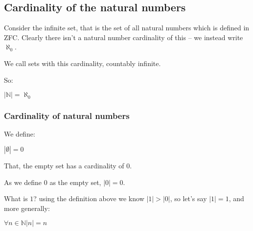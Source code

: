 
\subsection{Cardinality of the natural numbers}

Consider the infinite set, that is the set of all natural numbers which is defined in ZFC. Clearly there isn’t a natural number cardinality of this – we instead write \(\aleph_0\).

We call sets with this cardinality, countably infinite.

So:

\(|\mathbb{N} |=\aleph_0\)

\subsubsection{Cardinality of natural  numbers}

We define:

\(|\emptyset |=0\)

That, the empty set has a cardinality of \(0\).

As we define \(0\) as the empty set, \(|0|=0\).

What is \(1\)? using the definition above we know \(|1|>|0|\), so let's say \(|1|=1\), and more generally:

\(\forall n \in \mathbb{N} |n|=n\)

